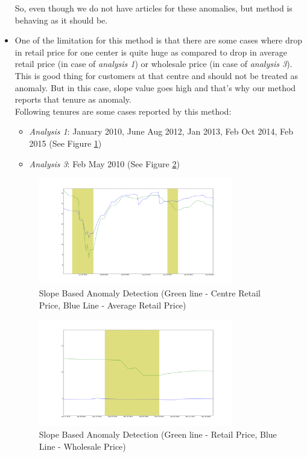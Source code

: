 \documentclass[a4paper,10pt]{report}
\begin{document}
\begin{itemize}
			
			
			So, even though we do not have articles for these anomalies, but method is behaving as it should be. 			
			
			\item One of the limitation for this method is that there are some cases where drop in retail price for one center is quite huge as compared to drop in average retail price (in case of \textit{analysis 1}) or wholesale price (in case of \textit{analysis 3}). This is good thing for customers at that centre and should not be treated as anomaly. But in this case, slope value goes high and that's why our method reports that tenure as anomaly.\\
			Following tenures are some cases reported by this method:
			\begin{itemize}
				\item \textit{Analysis 1}: January 2010, June Aug 2012, Jan 2013, Feb Oct 2014, Feb 2015  (See Figure \ref{fig:12112})
				\item \textit{Analysis 3}: Feb May 2010  (See Figure \ref{fig:12132})
			\end{itemize}
			
			\begin{figure}[H]
		    	\centering
  		    	\includegraphics[width=0.8\textwidth]{graphs/12112.png}
		    	\caption{Slope Based Anomaly Detection (Green line - Centre Retail Price, Blue Line - Average Retail Price)}
		    	\label{fig:12112}
			\end{figure}
			
			\begin{figure}[H]
		    	\centering
  		    	\includegraphics[width=0.8\textwidth]{graphs/12132.png}
		    	\caption{Slope Based Anomaly Detection (Green line - Retail Price, Blue Line - Wholesale Price)}
		    	\label{fig:12132}
			\end{figure}
						

\end{itemize}
\end{document}
